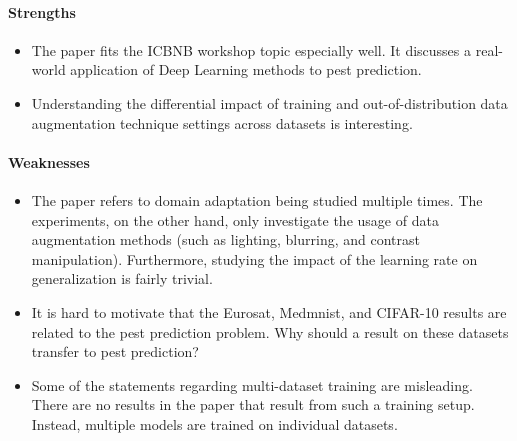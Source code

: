 \documentclass[11pt, a4paper]{include/gdm_format}
\begin{document}
\paragraph{Strengths}

\begin{itemize}
    \item The paper fits the ICBNB workshop topic especially well. It discusses a real-world application of Deep Learning methods to pest prediction.
    \item Understanding the differential impact of training and out-of-distribution data augmentation technique settings across datasets is interesting.  
\end{itemize}

\paragraph{Weaknesses}
\begin{itemize}
    \item The paper refers to domain adaptation being studied multiple times. The experiments, on the other hand, only investigate the usage of data augmentation methods (such as lighting, blurring, and contrast manipulation). Furthermore, studying the impact of the learning rate on generalization is fairly trivial.
    \item It is hard to motivate that the Eurosat, Medmnist, and CIFAR-10 results are related to the pest prediction problem. Why should a result on these datasets transfer to pest prediction?
    \item Some of the statements regarding multi-dataset training are misleading. There are no results in the paper that result from such a training setup. Instead, multiple models are trained on individual datasets.
\end{itemize}
\end{document}
